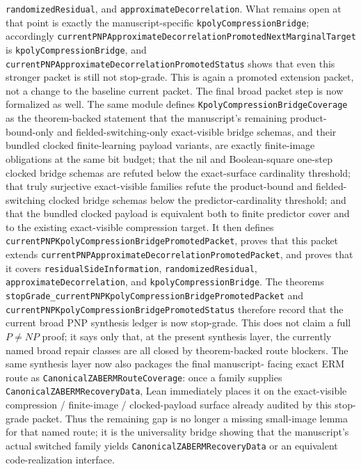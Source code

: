 \documentclass[11pt]{article}
\theoremstyle{remark}
\begin{document}
\texttt{randomizedResidual}, and \texttt{approximateDecorrelation}.  What
remains open at that point is exactly the manuscript-specific
\texttt{kpolyCompressionBridge}; accordingly
\texttt{currentPNPApproximateDecorrelationPromotedNextMarginalTarget} is
\texttt{kpolyCompressionBridge}, and
\texttt{currentPNPApproximateDecorrelationPromotedStatus} shows that even this
stronger packet is still not stop-grade.  This is again a promoted extension
packet, not a change to the baseline current packet.
The final broad packet step is now formalized as well.  The same module defines
\texttt{KpolyCompressionBridgeCoverage} as the theorem-backed statement that the
manuscript's remaining product-bound-only and fielded-switching-only
exact-visible bridge schemas, and their bundled clocked finite-learning payload
variants, are exactly finite-image obligations at the same bit budget; that the
nil and Boolean-square one-step clocked bridge schemas are refuted below the
exact-surface cardinality threshold; that truly surjective exact-visible
families refute the product-bound and fielded-switching clocked bridge schemas
below the predictor-cardinality threshold; and that the bundled clocked payload
is equivalent both to finite predictor cover and to the existing exact-visible
compression target.  It then defines
\texttt{currentPNPKpolyCompressionBridgePromotedPacket}, proves that this
packet extends
\texttt{currentPNPApproximateDecorrelationPromotedPacket}, and proves that it
covers \texttt{residualSideInformation}, \texttt{randomizedResidual},
\texttt{approximateDecorrelation}, and \texttt{kpolyCompressionBridge}.  The
theorems \texttt{stopGrade\_currentPNPKpolyCompressionBridgePromotedPacket} and
\texttt{currentPNPKpolyCompressionBridgePromotedStatus} therefore record that
the current broad PNP synthesis ledger is now stop-grade.  This does not claim
a full \(P \neq NP\) proof; it says only that, at the present synthesis layer,
the currently named broad repair classes are all closed by theorem-backed route
blockers.  The same synthesis layer now also packages the final manuscript-
facing exact ERM route as \texttt{CanonicalZABERMRouteCoverage}: once a family
supplies \texttt{CanonicalZABERMRecoveryData}, Lean immediately places it on
the exact-visible compression / finite-image / clocked-payload surface already
audited by this stop-grade packet.  Thus the remaining gap is no longer a
missing small-image lemma for that named route; it is the universality bridge
showing that the manuscript's actual switched family yields
\texttt{CanonicalZABERMRecoveryData} or an equivalent code-realization
interface.
\end{document}
